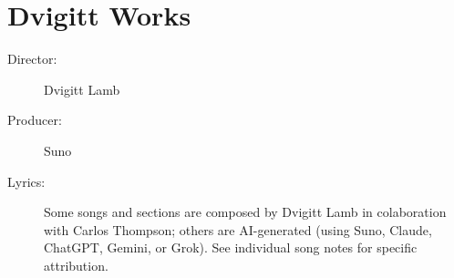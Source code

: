 \chapter{Dvigitt Works}

\begin{description}
\item[Director:] Dvigitt Lamb
\item[Producer:] Suno
\item[Lyrics:] Some songs and sections are composed by Dvigitt Lamb in colaboration with Carlos Thompson; others are AI-generated (using Suno, Claude, ChatGPT, Gemini, or Grok). %
See individual song notes for specific attribution.
\end{description}

\sepbar

























































